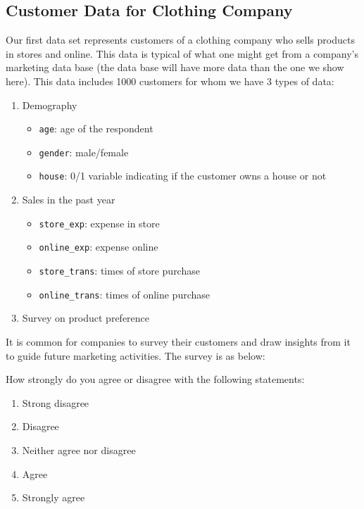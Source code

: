 \documentclass[
]{article}
\providecommand{\tightlist}{%
  \setlength{\itemsep}{0pt}\setlength{\parskip}{0pt}}
\begin{document}
\hypertarget{customer-data-for-clothing-company}{%
\subsection{Customer Data for Clothing
Company}\label{customer-data-for-clothing-company}}

Our first data set represents customers of a clothing company who sells
products in stores and online. This data is typical of what one might
get from a company's marketing data base (the data base will have more
data than the one we show here). This data includes 1000 customers for
whom we have 3 types of data:

\begin{enumerate}
\def\labelenumi{\arabic{enumi}.}
\tightlist
\item
  Demography

  \begin{itemize}
  \tightlist
  \item
    \texttt{age}: age of the respondent
  \item
    \texttt{gender}: male/female
  \item
    \texttt{house}: 0/1 variable indicating if the customer owns a house
    or not
  \end{itemize}
\item
  Sales in the past year

  \begin{itemize}
  \tightlist
  \item
    \texttt{store\_exp}: expense in store
  \item
    \texttt{online\_exp}: expense online
  \item
    \texttt{store\_trans}: times of store purchase
  \item
    \texttt{online\_trans}: times of online purchase
  \end{itemize}
\item
  Survey on product preference
\end{enumerate}

It is common for companies to survey their customers and draw insights
from it to guide future marketing activities. The survey is as below:

How strongly do you agree or disagree with the following statements:

\begin{enumerate}
\def\labelenumi{\arabic{enumi}.}
\tightlist
\item
  Strong disagree
\item
  Disagree
\item
  Neither agree nor disagree
\item
  Agree
\item
  Strongly agree
\end{enumerate}
\end{document}
